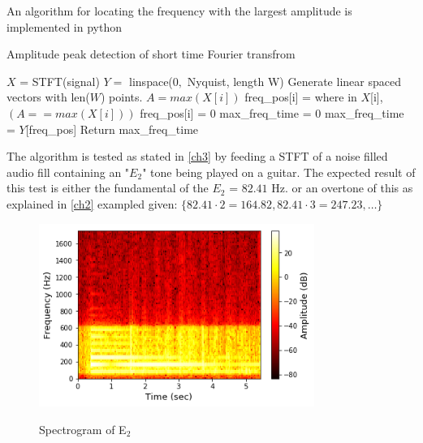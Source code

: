 An algorithm for locating the frequency with the largest amplitude  is implemented in python 
\begin{algorithm}[H]
\caption{Amplitude peak detection of short time Fourier transfrom}
\label{alg:FIR}
\begin{algorithmic}[1] 
\State  $X$ = STFT(signal) 
\State $Y =$ linspace($0,$ Nyquist, length W) \Comment Generate linear spaced vectors with len($W$) points.
		\State $A = max(X[i])$ 
		 
			\State freq\_pos[i] = where in $X$[i], $(A == max(X[i]))$ 
		\Else
			\State freq\_pos[i] = 0	
		\EndIf
			\State max\_freq\_time = 0
		\Else
			\State max\_freq\_time = $Y$[freq\_pos]
		\EndIf
	\EndFor
	\State Return max\_freq\_time
\EndProcedure
\end{algorithmic}
\end{algorithm}

The algorithm is tested as stated in \ref{ch3}  by feeding  a STFT of a noise filled audio fill containing an "$E_2$" tone being played on a guitar. 
The expected result of this test is either the fundamental of the $E_2$ = $82.41$ Hz. or an overtone of this as explained in \ref{ch2} exampled given: $\{82.41 \cdot 2 = 164.82, 82.41 \cdot 3 = 247.23, \dots \}$ 

\begin{figure}[H]
\centering 
\includegraphics[width=0.8\textwidth]{figures/peak_detection/20170511_spectogram_E_2.png}
\label{fig:spec_E_2}
\caption{Spectrogram of E$_2$}
\end{figure}


